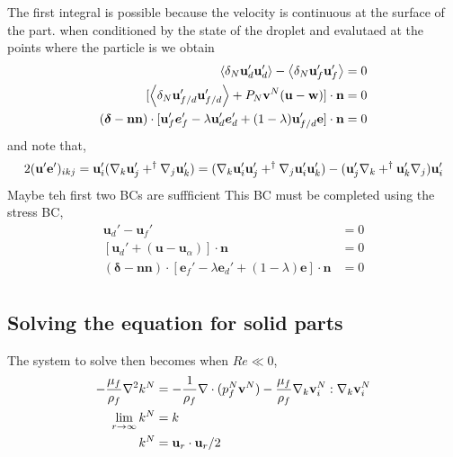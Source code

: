 The first integral is possible because the velocity is continuous at the surface of the part. 
when conditioned by the state of the droplet and evalutaed at the points where the particle is we obtain 
\begin{align}
    \avg{\delta_N \textbf{u}_d'\textbf{u}_d'} -  \avg{\delta_N \textbf{u}_f'\textbf{u}_f'}&=0 \\
    [\avg{\delta_N \textbf{u}_{f/d}'\textbf{u}_{f/d}' }+ P_N \textbf{v}^N (\textbf{u} - \textbf{w} )]\cdot \textbf{n} &= 0\\
    (\bm\delta - \textbf{nn})\cdot  [\textbf{u}_f'\bm e_f'- \lambda \textbf{u}_d'\bm e_d' + (1-\lambda) \textbf{u}_{f/d}'\textbf{e}]\cdot \textbf{n} &= 0\\
\end{align}
and note that,
\begin{equation}
    2(\textbf{u}' \textbf{e}')_{ikj} 
    = 
    \textbf{u}'_i(\mathbf{\nabla}_k \textbf{u}'_j+ ^\dagger \mathbf{\nabla}_j \textbf{u}'_k)
    =
    (\mathbf{\nabla}_k \textbf{u}'_i\textbf{u}'_j+ ^\dagger \mathbf{\nabla}_j \textbf{u}'_i\textbf{u}'_k)
    - (\textbf{u}'_j\mathbf{\nabla}_k + ^\dagger \textbf{u}'_k\mathbf{\nabla}_j )\textbf{u}'_i
\end{equation}
Maybe teh first two BCs are suffficient 
This BC must be completed using the stress BC, 
\begin{align}
    \textbf{u}_d' -  \textbf{u}_f'&=0 \\
    [\textbf{u}_d' + (\textbf{u} - \textbf{u}_\alpha)]\cdot \textbf{n} &= 0\\
    (\bm\delta - \textbf{nn})\cdot  [\bm e_f'- \lambda \bm e_d' + (1-\lambda) \textbf{e}]\cdot \textbf{n} &= 0\\
\end{align}

\subsection{Solving the equation for solid parts}
The system to solve then becomes when $Re \ll 0$, 
\begin{align*}
    - \frac{\mu_f}{\rho_f} \mathbf{\nabla}^2k^N
    &=
    -\frac{1}{\rho_f}\mathbf{\nabla}\cdot ( p_f^N \textbf{v}^N )
    -\frac{\mu_f}{\rho_f}   \mathbf{\nabla}_k\textbf{v}^N _i:\mathbf{\nabla}_k \textbf{v}^N _i \\
    \lim_{r \to \infty} k^N &= k \\
    k^N &= \textbf{u}_r \cdot \textbf{u}_r/2
\end{align*}


